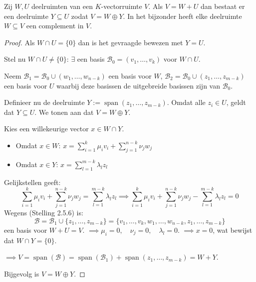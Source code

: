 \begin{lemma}[2.5.8]
    Zij $W, U$ deelruimten van een $K$-vectorruimte $V$. Als $V = W + U$ dan bestaat er een deelruimte $Y \subseteq U$ zodat $V = W \oplus Y$.
    In het bijzonder heeft elke deelruimte $W \subseteq V$ een complement in $V$.
\end{lemma}
\begin{proof}
    Als \(W \cap U = \{0\}\) dan is het gevraagde bewezen met \(Y = U\).

    Stel nu \(W \cap U \neq \{0\}\):
    \(\exists\) een basis \(\mathcal{B}_0 = (v_1,\dots,v_k)\) voor \(W \cap U\).

    Neem \(\mathcal{B}_1 = \mathcal{B}_0 \cup (w_1,\dots,w_{n-k}) \) een basis voor \(W\), \(\mathcal{B}_2 = \mathcal{B}_0 \cup (z_1,\dots,z_{m-k}) \) een basis voor \(U\) waarbij deze basissen de uitgebreide basissen zijn van \(\mathcal{B}_0\).

    Definieer nu de deelruimte $Y := \operatorname{span}(z_1, \dots, z_{m-k})$.
    Omdat alle $z_i \in U$, geldt dat $Y \subseteq U$. We tonen aan dat $V = W \oplus Y$.

    Kies een willekeurige vector $x \in W \cap Y$.
    \begin{itemize}
        \item Omdat $x \in W$:
        \(x = \sum_{i=1}^{k} \mu_i v_i + \sum_{j=1}^{n-k} \nu_j w_j \)
        \item Omdat $x \in Y$:
        \( x = \sum_{l=1}^{m-k} \lambda_l z_l \)
    \end{itemize}
    Gelijkstellen geeft:
    \[ \sum_{i=1}^{k} \mu_i v_i + \sum_{j=1}^{n-k} \nu_j w_j = \sum_{l=1}^{m-k} \lambda_l z_l \implies \sum_{i=1}^{k} \mu_i v_i + \sum_{j=1}^{n-k} \nu_j w_j - \sum_{l=1}^{m-k} \lambda_l z_l = 0 \]
    Wegens (Stelling 2.5.6) is:
    \[ \mathcal{B} = \mathcal{B}_1 \cup \{z_1, \dots, z_{m-k}\} = \{v_1, \dots, v_k, w_1, \dots, w_{n-k}, z_1, \dots, z_{m-k}\} \]
    een basis voor $W + U = V$.
    \( \implies \mu_i = 0, \quad \nu_j = 0, \quad \lambda_l = 0 \).
    $\implies x = 0$, wat bewijst dat $W \cap Y = \{0\}$.

    \(\implies V = \operatorname{span}(\mathcal{B}) = \operatorname{span}(\mathcal{B}_1) + \operatorname{span}(z_1, \dots, z_{m-k}) = W + Y \).

    Bijgevolg is \(V = W \oplus Y\).
\end{proof}

